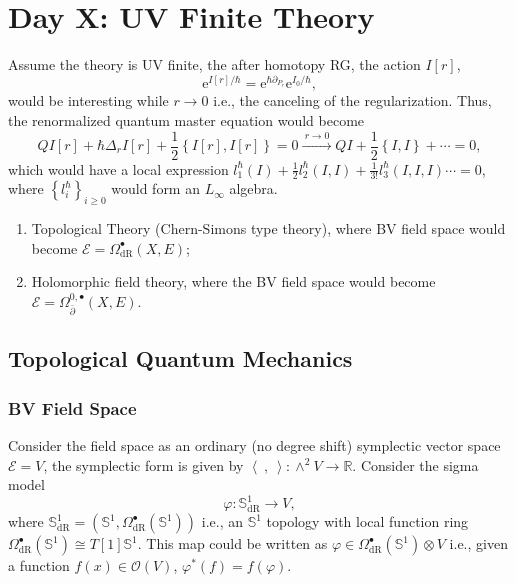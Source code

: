 \documentclass[10pt]{article}
\begin{document}
\section{Day X: UV Finite Theory}

Assume the theory is UV finite, the after homotopy RG, the action $ I[r]$,
\begin{equation*}
  \mathrm{e}^{I[r] / \hbar} = \mathrm{e}^{\hbar \partial_{P_r}} \mathrm{e}^{I_0 / \hbar},
\end{equation*}
would be interesting while $ r \rightarrow 0$ i.e., the canceling of the regularization. Thus, the renormalized quantum master equation would become
\begin{equation*}
  Q I[r] + \hbar \Delta_r I[r] + \frac{1}{2} \left\{ I[r], I[r] \right\} = 0 \xrightarrow{~ r \rightarrow 0 ~} Q I + \frac{1}{2} \left\{ I, I \right\} + \cdots = 0,
\end{equation*}
which would have a local expression $l_1^{\hbar}(I) + \frac{1}{2} l_2^{\hbar}(I, I) + \frac{1}{3!} l^{\hbar}_3 (I, I, I) \cdots = 0$,
where $ \left\{ l_{i}^{\hbar} \right\}_{i \ge 0}$ would form an $ L_{\infty }$ algebra.

\begin{example}
  \begin{enumerate}[(1)]
    \item Topological Theory (Chern-Simons type theory), where BV field space would become $ \mathcal{E} = \Omega^{\bullet}_{\mathrm{dR}}(X, E)$;
    \item Holomorphic field theory, where the BV field space would become $ \mathcal{E} = \Omega^{0,\bullet}_{\bar{\partial}}(X, E) $.
  \end{enumerate}
\end{example}

\subsection{Topological Quantum Mechanics}

\subsubsection{BV Field Space}

Consider the field space as an ordinary (no degree shift) symplectic vector space $ \mathcal{E} = V$, the symplectic form is given by $\left< ~,~ \right>: \wedge^{2} V \rightarrow \mathbb{R}$.
Consider the sigma model
\begin{equation*}
  \varphi: \mathbb{S}^{1}_{\mathrm{dR}} \rightarrow V,
\end{equation*}
where $ \mathbb{S}^{1}_{\mathrm{dR}} = \left( \mathbb{S}^{1}, \Omega_{\mathrm{dR}}^{\bullet}(\mathbb{S}^{1}) \right)$ i.e., an $ \mathbb{S}^{1}$ topology with local function ring $ \Omega^{\bullet}_{\mathrm{dR}}(\mathbb{S}^{1}) \cong T[1] \mathbb{S}^{1}$.
This map could be written as $ \varphi \in \Omega_{\mathrm{dR}}^{\bullet}(\mathbb{S}^{1}) \otimes V$ i.e., given a function $ f(x) \in \mathcal{O}(V)$, $ \varphi^{*}(f) = f(\varphi)$.
\end{document}
